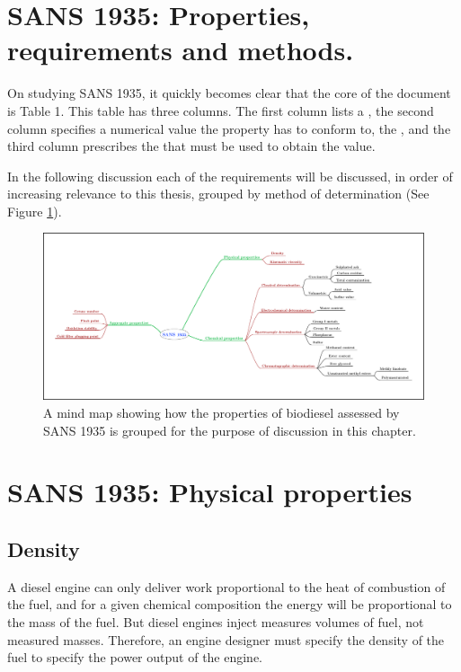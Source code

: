 \section{SANS 1935: Properties, requirements and methods.}

On studying SANS 1935, it quickly becomes clear that the core of the document
is Table 1. This table has three columns. The first column lists a
, the second column specifies a numerical value the property
has to conform to, the , and the third column prescribes
the  that must be used to obtain the value.

In the following discussion each of the requirements will be discussed, in order
of increasing relevance to this thesis, grouped by method of determination (See
Figure \ref{fig:MindMap}).


\begin{figure}
\centering
\includegraphics[width=\textwidth]{Figures/SANS1935.pdf}
\decoRule

\caption[Discussion of SANS 1935.]{A mind map showing how the properties of
biodiesel assessed by SANS 1935 is grouped for the purpose of discussion in this
chapter.}

\label{fig:MindMap}
\end{figure}

\section{SANS 1935: Physical properties}

\subsection{Density}

A diesel engine can only deliver work proportional to the heat of combustion of
the fuel, and for a given chemical composition the energy will be proportional
to the mass of the fuel. But diesel engines inject measures volumes of fuel, not
measured masses. Therefore, an engine designer must specify the density of the
fuel to specify the power output of the engine.

